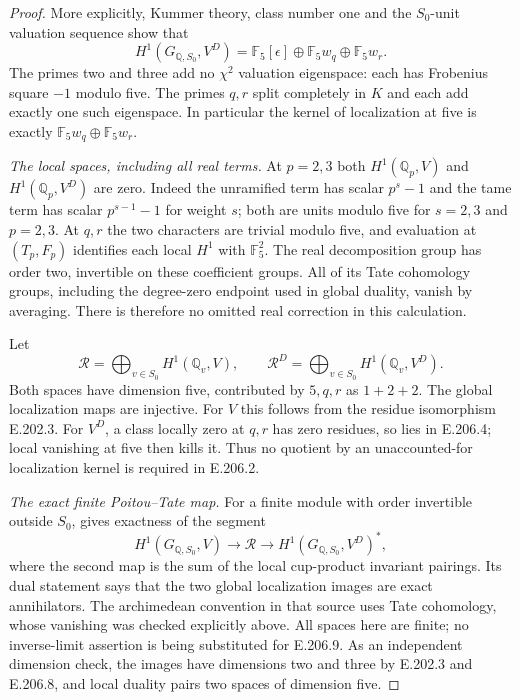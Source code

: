 \begin{proof}
More explicitly, Kummer theory, class number one and the
$S_0$-unit valuation sequence show that
\[
 H^1(G_{\mathbb Q,S_0},V^D)
   =\mathbb F_5[\epsilon]\oplus\mathbb F_5w_q\oplus\mathbb F_5w_r.
 \tag{E.206.8}
\]
The primes two and three add no $\chi^2$ valuation eigenspace:
each has Frobenius square $-1$ modulo five.  The primes $q,r$
split completely in $K$ and each add exactly one such eigenspace.
In particular the kernel of localization at five is exactly
$\mathbb F_5w_q\oplus\mathbb F_5w_r$.

\emph{The local spaces, including all real terms.}
At $p=2,3$ both $H^1(\mathbb Q_p,V)$ and
$H^1(\mathbb Q_p,V^D)$ are zero.  Indeed the unramified term
has scalar $p^s-1$ and the tame term has scalar $p^{s-1}-1$
for weight $s$; both are units modulo five for $s=2,3$ and
$p=2,3$.  At $q,r$ the two characters are trivial modulo five,
and evaluation at $(T_p,F_p)$ identifies each local $H^1$
with $\mathbb F_5^2$.  The real decomposition group has order
two, invertible on these coefficient groups.  All of its Tate
cohomology groups, including the degree-zero endpoint used
in global duality, vanish by averaging.  There is therefore
no omitted real correction in this calculation.

Let
\[
 \mathcal R=\bigoplus_{v\in S_0}H^1(\mathbb Q_v,V),\qquad
 \mathcal R^D=\bigoplus_{v\in S_0}H^1(\mathbb Q_v,V^D).
\]
Both spaces have dimension five, contributed by $5,q,r$ as
$1+2+2$.  The global localization maps are injective.
For $V$ this follows from the residue isomorphism E.202.3.
For $V^D$, a class locally zero at $q,r$ has zero residues,
so lies in E.206.4; local vanishing at five then kills it.
Thus no quotient by an unaccounted-for localization kernel
is required in E.206.2.

\emph{The exact finite Poitou--Tate map.}
For a finite module with order invertible outside $S_0$,
\citet[I.4.9--4.10(b), pp.~56--57]{CohMilneADT} gives exactness
of the segment
\[
 H^1(G_{\mathbb Q,S_0},V)\longrightarrow\mathcal R
 \longrightarrow H^1(G_{\mathbb Q,S_0},V^D)^*,
 \tag{E.206.9}
\]
where the second map is the sum of the local cup-product
invariant pairings.  Its dual statement says that the two
global localization images are exact annihilators.
The archimedean convention in that source uses Tate cohomology,
whose vanishing was checked explicitly above.  All spaces here
are finite; no inverse-limit assertion is being substituted
for E.206.9.  As an independent dimension check, the images
have dimensions two and three by E.202.3 and E.206.8, and
local duality pairs two spaces of dimension five.


\end{proof}
